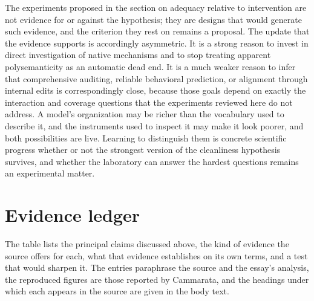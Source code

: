\documentclass[11pt]{article}
\begin{document}
The experiments proposed in the section on adequacy relative to intervention are not evidence for or against the hypothesis; they are designs that would generate such evidence, and the criterion they rest on remains a proposal. The update that the evidence supports is accordingly asymmetric. It is a strong reason to invest in direct investigation of native mechanisms and to stop treating apparent polysemanticity as an automatic dead end. It is a much weaker reason to infer that comprehensive auditing, reliable behavioral prediction, or alignment through internal edits is correspondingly close, because those goals depend on exactly the interaction and coverage questions that the experiments reviewed here do not address. A model's organization may be richer than the vocabulary used to describe it, and the instruments used to inspect it may make it look poorer, and both possibilities are live. Learning to distinguish them is concrete scientific progress whether or not the strongest version of the cleanliness hypothesis survives, and whether the laboratory can answer the hardest questions remains an experimental matter.

\appendix
\section{Evidence ledger}

The table lists the principal claims discussed above, the kind of evidence the source offers for each, what that evidence establishes on its own terms, and a test that would sharpen it. The entries paraphrase the source and the essay's analysis, the reproduced figures are those reported by Cammarata, and the headings under which each appears in the source are given in the body text.
\end{document}
